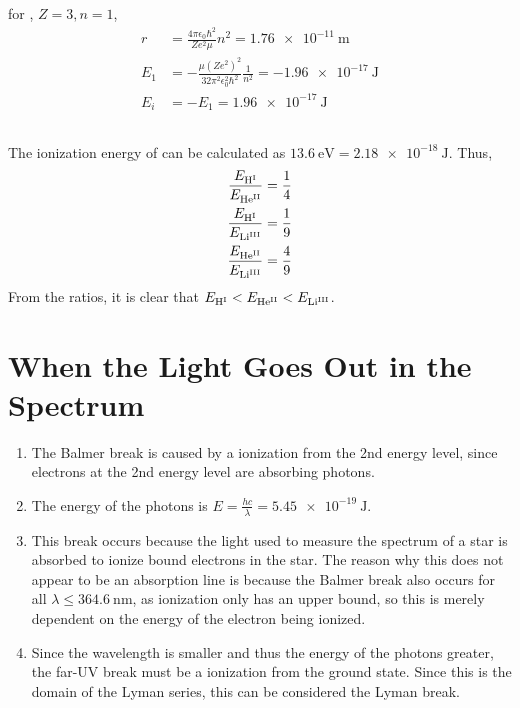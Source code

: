 \documentclass{article}
\begin{document}
\subsection{}

for , \(Z = 3, n = 1\),
\begin{align}
    r &= \frac{4 \pi \epsilon_0 \hbar^2}{Z e^2 \mu} n^2 = \SI{1.76e-11}{\meter} \\
    E_1 &= -\frac{\mu (Z e^2)^2}{32 \pi^2 \epsilon_0^2 \hbar^2} \frac{1}{n^2} = \SI{-1.96e-17}{\joule} \\
    E_i &= -E_1 = \SI{1.96e-17}{\joule}
\end{align}

\subsection{}

The ionization energy of  can be calculated as \(\SI{13.6}{\electronvolt} = \SI{2.18e-18}{\joule}\).
Thus,
\begin{align}
    \frac{E_{\ce{H^I}}}{E_{\ce{He^{II}}}} &= \frac{1}{4} \\
    \frac{E_{\ce{H^I}}}{E_{\ce{Li^{III}}}} &= \frac{1}{9} \\
    \frac{E_{\ce{He^{II}}}}{E_{\ce{Li^{III}}}} &= \frac{4}{9}
\end{align}
From the ratios, it is clear that \(E_{\ce{H^I}} < E_{\ce{He^{II}}} < E_{\ce{Li^{III}}}\).

\section{When the Light Goes Out in the Spectrum}

\begin{enumerate}
    \item The Balmer break is caused by a ionization from the 2nd energy level, since electrons at the 2nd energy level are absorbing photons.
    \item The energy of the photons is \(E = \frac{h c}{\lambda} = \SI{5.45e-19}{\joule}\).
    \item This break occurs because the light used to measure the spectrum of a star is absorbed to ionize bound electrons in the star.
    The reason why this does not appear to be an absorption line is because the Balmer break also occurs for all \(\lambda \leqslant \SI{364.6}{\nano\meter}\), as ionization only has an upper bound, so this is merely dependent on the energy of the electron being ionized.
    \item Since the wavelength is smaller and thus the energy of the photons greater, the far-UV break must be a ionization from the ground state.
    Since this is the domain of the Lyman series, this can be considered the Lyman break.
\end{enumerate}
\end{document}
